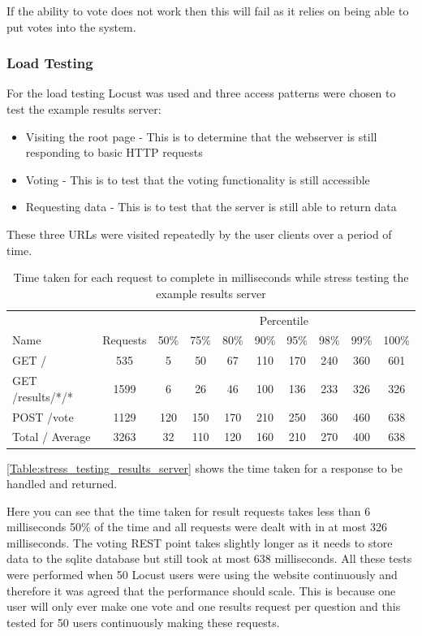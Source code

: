 If the ability to vote does not work then this will fail as it relies on being able to put votes into the system.

\subsubsection{Load Testing}

For the load testing Locust was used and three access patterns were chosen to test the example results server:

\begin{itemize}
\item Visiting the root page - This is to determine that the webserver is still responding to basic HTTP requests
\item Voting - This is to test that the voting functionality is still accessible
\item Requesting data - This is to test that the server is still able to return data
\end{itemize}

These three URLs were visited repeatedly by the user clients over a period of time.

\begin{table}
\caption{Time taken for each request to complete in milliseconds while stress testing the example results server}
\begin{tabular}{l c  c c c c c c c c }
\hline 
& & \multicolumn{8}{c}{Percentile} \\
Name & Requests & 50\% & 75\% & 80\% & 90\% & 95\% & 98\% & 99\% & 100\% \\ 
\hline 
GET / & 535 & 5 & 50 & 67 & 110 & 170 & 240 & 360 & 601 \\ 
\hline 
GET /results/*/* & 1599 & 6 & 26 & 46 & 100 & 136 & 233 & 326 & 326 \\ 
\hline 
POST /vote & 1129 & 120 & 150 & 170 & 210 & 250 & 360 & 460 & 638 \\ 
\hline 
Total / Average & 3263 & 32 & 110 & 120 & 160 & 210 & 270 & 400 & 638 \\ 
\hline 
\end{tabular}
\label{Table:stress_testing_results_server}
\end{table}

\autoref{Table:stress_testing_results_server} shows the time taken for a response to be handled and returned.

Here you can see that the time taken for result requests takes less than 6 milliseconds 50\% of the time and all requests were dealt with in at most 326 milliseconds. The voting \gls{REST} point takes slightly longer as it needs to store data to the sqlite database but still took at most 638 milliseconds. All these tests were performed when 50 Locust users were using the website continuously and therefore it was agreed that the performance should scale. This is because one user will only ever make one vote and one results request per question and this tested for 50 users continuously making these requests.

